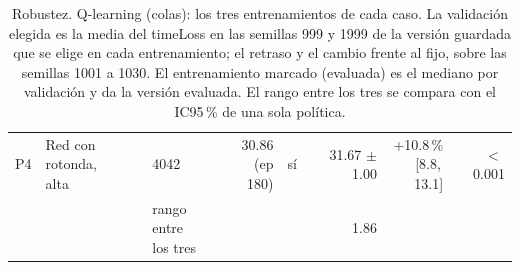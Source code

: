 \begin{table}[H]
\begin{tabular}{lllrlrrr}
P4 & \makecell[l]{Red con rotonda,\\{}alta} & 4042 & \makecell[r]{30.86\\{}(ep 180)} & sí & \makecell[r]{31.67\\{}$\pm$ 1.00} & \makecell[r]{+10.8\,\%\\{}[8.8,\,13.1]} & $<$\,0.001 \\
 & & \makecell[l]{rango entre\\{}los tres} & & & 1.86 & & \\
\bottomrule
\end{tabular}
\caption[Robustez: entrenamientos de Q-learning (colas)]{Robustez. Q-learning (colas): los tres entrenamientos de cada caso. La validación elegida es la media del timeLoss en las semillas 999 y 1999 de la versión guardada que se elige en cada entrenamiento; el retraso y el cambio frente al fijo, sobre las semillas 1001 a 1030. El entrenamiento marcado (evaluada) es el mediano por validación y da la versión evaluada. El rango entre los tres se compara con el IC95\,\% de una sola política.}
\label{tab:robustez-veredicto-bases-ql-colas}
\end{table}

